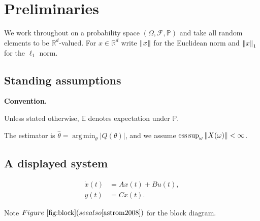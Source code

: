 \documentclass[12pt,twoside,openright]{report}
\newcommand{\R}{\mathbb{R}}
\newcommand{\E}{\mathbb{E}}
\newcommand{\Prob}{\mathbb{P}}
\providecommand{\abs}[1]{\left\lvert #1 \right\rvert}
\DeclareMathOperator{\argmin}{arg\,min}
\DeclareMathOperator*{\esssup}{ess\,sup}
\newenvironment{remark}[1][Remark]{%
  \par\medskip\noindent\textbf{#1.}\enspace%
}{%
  \par\medskip%
}
\newcommand{\citefig}[2]{Figure~\ref{#1} (see also \cite{#2})}
\begin{document}
\chapter{Preliminaries}
\label{ch:prelim}

We work throughout on a probability space $(\Omega, \mathcal{F}, \Prob)$ and take
all random elements to be $\R^d$-valued. For $x \in \R^d$ write $\norm{x}$ for the
Euclidean norm and $\norm[1]{x}$ for the $\ell_1$ norm.

\section{Standing assumptions}

\begin{remark}[Convention]
Unless stated otherwise, $\E$ denotes expectation under $\Prob$.
\end{remark}

The estimator is $\hat\theta = \argmin_{\theta} \abs{Q(\theta)}$, and we assume
$\esssup_\omega \norm{X(\omega)} < \infty$.




\section{A displayed system}

\begin{align}
  \label{eq:system}
  \dot{x}(t) &= A x(t) + B u(t), \\
  y(t)       &= C x(t).
\end{align}

Note $\citefig{fig:block}{astrom2008}$ for the block diagram.
\end{document}

